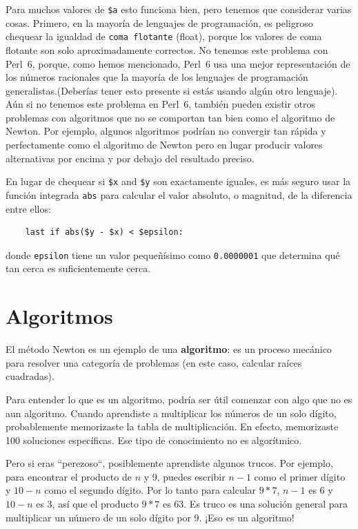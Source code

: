 Para muchos valores de {\tt \$a} esto funciona bien,
pero tenemos que considerar varias cosas.
Primero, en la mayoría de lenguajes de programación, es peligroso
chequear la igualdad de {\tt coma flotante} (float), porque
los valores de coma flotante son solo aproximadamente correctos.
No tenemos este problema con Perl~6, porque, como hemos mencionado, 
Perl~6 usa una mejor representación de los números racionales que la mayoría
de los lenguajes de programación generalistas.(Deberías tener esto
presente si estás usando algún otro lenguaje). Aún si no tenemos este problema
en Perl~6, también pueden existir otros problemas con algoritmos que no se
comportan tan bien como el algoritmo de Newton. Por ejemplo, 
algunos algoritmos podrían no convergir tan rápida y perfectamente como
el algoritmo de Newton pero en lugar producir valores
alternativas por encima y por debajo del resultado preciso.

En lugar de chequear si {\tt \$x} and {\tt \$y} son exactamente iguales,
es más seguro usar la función integrada {\tt abs} para calcular el 
valor absoluto, o magnitud, de la diferencia entre ellos:

\begin{lstlisting}
    last if abs($y - $x) < $epsilon:
\end{lstlisting}
%
donde \verb"epsilon" tiene un valor pequeñísimo como {\tt 0.0000001} 
que determina qué tan cerca es suficientemente cerca.



\section{Algoritmos}

El método Newton es un ejemplo de una {\bf algoritmo}: es un proceso
mecánico para resolver una categoría de problemas (en este caso,
calcular raíces cuadradas).

Para entender lo que es un algoritmo, podría ser útil comenzar con algo que no 
es aun algoritmo. Cuando aprendiste a multiplicar los números de un solo dígito, 
probablemente memorizaste la tabla de multiplicación. En efecto, 
memorizaste 100 soluciones específicas. Ese tipo de conocimiento no
es algorítmico.

Pero si eras ``perezoso``, posiblemente aprendiste algunos 
trucos. Por ejemplo, para encontrar el producto de $n$ y 9,
puedes escribir $n-1$ como el primer dígito y $10-n$ como el 
segundo dígito. Por lo tanto para calcular $9*7$, $n-1$ es 6 y
$10-n$ es 3, así que el producto $9*7$ es 63. Es truco es una 
solución general para multiplicar un número de un solo 
dígito por 9. ¡Eso es un algoritmo!

